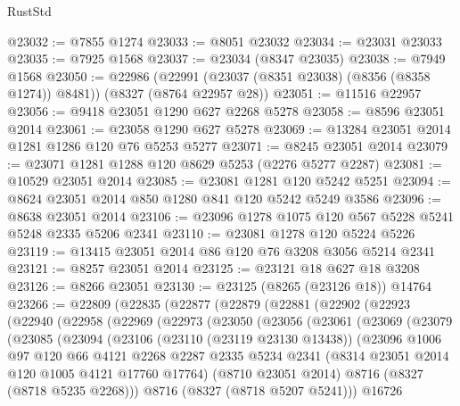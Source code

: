\begin{lexlean}{RustStd}
\begin{coremodule}
{\begin{coremodule}
{{{{{{{{{{{{{{{{{{{{{{{{{{{{{{{{{{{{{{{{{{{{{{{{{{{{{{@23032 := @7855 @1274
@23033 := @8051 @23032
@23034 := @23031 @23033
@23035 := @7925 @1568
@23037 := @23034 (@8347 @23035)
@23038 := @7949 @1568
@23050 := @22986
    (@22991 (@23037 (@8351 @23038) (@8356 (@8358 @1274)) @8481))
    (@8327 (@8764 @22957 @28))
@23051 := @11516 @22957
@23056 := @9418 @23051 @1290 @627 @2268 @5278
@23058 := @8596 @23051 @2014
@23061 := @23058 @1290 @627 @5278
@23069 := @13284 @23051 @2014 @1281 @1286 @120 @76 @5253 @5277
@23071 := @8245 @23051 @2014
@23079 := @23071 @1281 @1288 @120 @8629 @5253 (@2276 @5277 @2287)
@23081 := @10529 @23051 @2014
@23085 := @23081 @1281 @120 @5242 @5251
@23094 := @8624 @23051 @2014 @850 @1280 @841 @120 @5242 @5249 @3586
@23096 := @8638 @23051 @2014
@23106 := @23096 @1278 @1075 @120 @567 @5228 @5241 @5248 @2335 @5206 @2341
@23110 := @23081 @1278 @120 @5224 @5226
@23119 := @13415 @23051 @2014 @86 @120 @76 @3208 @3056 @5214 @2341
@23121 := @8257 @23051 @2014
@23125 := @23121 @18 @627 @18 @3208
@23126 := @8266 @23051
@23130 := @23125 (@8265 (@23126 @18)) @14764
@23266 := @22809
    (@22835
      (@22877
        (@22879
          (@22881
            (@22902
              (@22923
                (@22940
                  (@22958
                    (@22969
                      (@22973
                        (@23050
                          (@23056
                            (@23061
                              (@23069
                                (@23079
                                  (@23085
                                    (@23094
                                      (@23106
                                        (@23110 (@23119 @23130 @13438))
                                        (@23096
                                          @1006
                                          @97
                                          @120
                                          @66
                                          @4121
                                          @2268
                                          @2287
                                          @2335
                                          @5234
                                          @2341
                                          (@8314 @23051 @2014 @120 @1005 @4121 @17760 @17764)
                                          (@8710 @23051 @2014)
                                          @8716
                                          (@8327 (@8718 @5235 @2268)))
                                        @8716
                                        (@8327 (@8718 @5207 @5241)))
                                      @16726
}}}}}}}}}}}}}}}}}}}}}}}}}}}}}}}}}}}}}}}}}}}}}}}}}}}}}}
\end{coremodule}}
\end{coremodule}
\end{lexlean}
